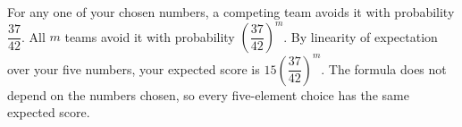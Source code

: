 For any one of your chosen numbers, a competing team avoids it with probability $\dfrac{37}{42}$. All $m$ teams avoid it with probability $(\dfrac{37}{42})^m$. By linearity of expectation over your five numbers, your expected score is $\boxed{15(\dfrac{37}{42})^m}$. The formula does not depend on the numbers chosen, so every five-element choice has the same expected score.
